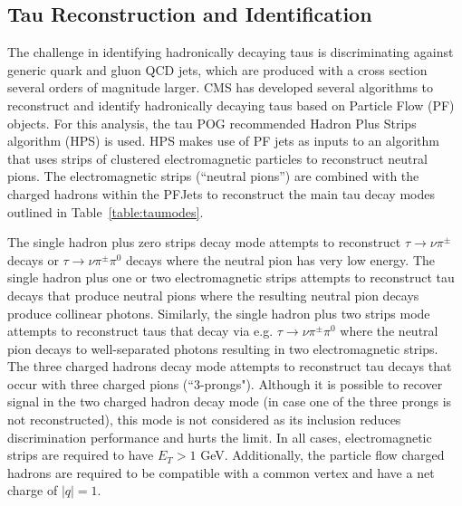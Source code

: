 \subsection{Tau Reconstruction and Identification}\label{sec:tauID}

The challenge in identifying hadronically decaying taus is discriminating against generic quark and gluon QCD jets, 
which are produced with a cross section several orders of magnitude larger. CMS has developed several algorithms to 
reconstruct and identify
hadronically decaying taus based on Particle Flow (PF) objects. For this analysis, the tau POG 
recommended Hadron Plus Strips algorithm (HPS) is used. HPS makes use of PF jets as 
inputs to an algorithm that uses strips of clustered electromagnetic particles to reconstruct neutral pions. The 
electromagnetic strips (``neutral pions'') are combined with the charged hadrons within the PFJets to 
reconstruct the main tau decay modes outlined in Table~\ref{table:taumodes}.

\begin{table}[ht]
  \caption{Reconstructed Tau Decay Modes}
  \label{table:taumodes} %
\end{table}

The single hadron plus zero strips decay mode attempts to reconstruct $\tau \to \nu\pi^{\pm}$ decays or $\tau \to 
\nu\pi^{\pm}\pi^{0}$ decays where the neutral pion has very low energy. The single hadron plus one or two 
electromagnetic strips attempts to reconstruct tau decays that produce neutral pions where the resulting neutral pion 
decays produce collinear photons. Similarly, the single hadron plus two strips mode attempts to reconstruct taus that 
decay via e.g. $\tau \to \nu\pi^{\pm}\pi^{0}$ where the neutral pion decays to well-separated photons resulting in two 
electromagnetic strips. The three charged hadrons decay mode attempts to reconstruct tau decays that occur with three charged pions (``3-prongs"). Although it is possible to recover signal in the two charged hadron decay mode (in case one of the
three prongs is not reconstructed), this mode is not considered as its inclusion reduces discrimination performance and 
hurts the limit. 
In all cases, electromagnetic strips are 
required to have $E_{T} > 1$ GeV. Additionally,
the particle flow charged hadrons are required to be compatible with a common 
vertex and have a net charge of $|q|=1$.

